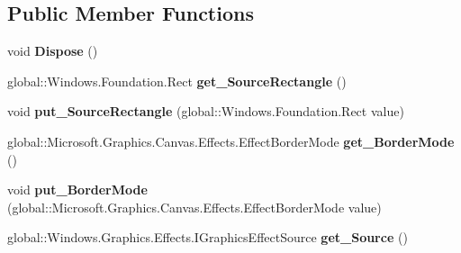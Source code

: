 \subsection*{Public Member Functions}
\begin{DoxyCompactItemize}
\item 
\mbox{\label{class_microsoft_1_1_graphics_1_1_canvas_1_1_effects_1_1_crop_effect_a9b3ea35f19a680f460f21d9a9e788048}} 
void {\bfseries Dispose} ()
\item 
\mbox{\label{class_microsoft_1_1_graphics_1_1_canvas_1_1_effects_1_1_crop_effect_a7623c2c77a5d02cdfdd9c57daadea17b}} 
global\+::\+Windows.\+Foundation.\+Rect {\bfseries get\+\_\+\+Source\+Rectangle} ()
\item 
\mbox{\label{class_microsoft_1_1_graphics_1_1_canvas_1_1_effects_1_1_crop_effect_a1d926a1f046dba84ddf63f41d43adb8d}} 
void {\bfseries put\+\_\+\+Source\+Rectangle} (global\+::\+Windows.\+Foundation.\+Rect value)
\item 
\mbox{\label{class_microsoft_1_1_graphics_1_1_canvas_1_1_effects_1_1_crop_effect_ad455f8e79c452f9b75bdc6cce955b14c}} 
global\+::\+Microsoft.\+Graphics.\+Canvas.\+Effects.\+Effect\+Border\+Mode {\bfseries get\+\_\+\+Border\+Mode} ()
\item 
\mbox{\label{class_microsoft_1_1_graphics_1_1_canvas_1_1_effects_1_1_crop_effect_a44f8835555e034c842513c801cfdf55f}} 
void {\bfseries put\+\_\+\+Border\+Mode} (global\+::\+Microsoft.\+Graphics.\+Canvas.\+Effects.\+Effect\+Border\+Mode value)
\item 
\mbox{\label{class_microsoft_1_1_graphics_1_1_canvas_1_1_effects_1_1_crop_effect_abe38d9ad2be28d73b379306d36c91530}} 
global\+::\+Windows.\+Graphics.\+Effects.\+I\+Graphics\+Effect\+Source {\bfseries get\+\_\+\+Source} ()
\item 
\mbox{\label{class_microsoft_1_1_graphics_1_1_canvas_1_1_effects_1_1_crop_effect_a0349ffb4909aa27c22cbdc2d7771c820}} 

\end{DoxyCompactItemize}
